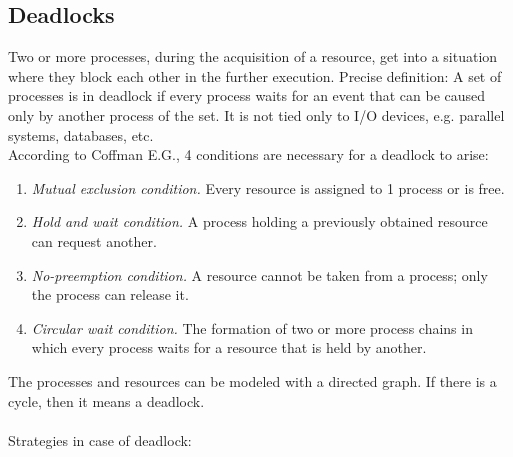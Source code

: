 \documentclass[margin=0px]{article}
\begin{document}
\subsection{Deadlocks}

Two or more processes, during the acquisition of a resource, get into a situation where they block each other in the further execution. Precise definition: A set of processes is in deadlock if every process waits for an event that can be caused only by another process of the set. It is not tied only to I/O devices, e.g. parallel systems, databases, etc. \\
According to Coffman E.G., 4 conditions are necessary for a deadlock to arise:
\begin{enumerate}
    \item \textit{Mutual exclusion condition.} Every resource is assigned to 1 process or is free.
    \item \textit{Hold and wait condition.} A process holding a previously obtained resource can request another.
    \item \textit{No-preemption condition.} A resource cannot be taken from a process; only the process can release it.
    \item \textit{Circular wait condition.} The formation of two or more process chains in which every process waits for a resource that is held by another.
\end{enumerate}
The processes and resources can be modeled with a directed graph. If there is a cycle, then it means a deadlock. \\ \\
Strategies in case of deadlock:
\end{document}
